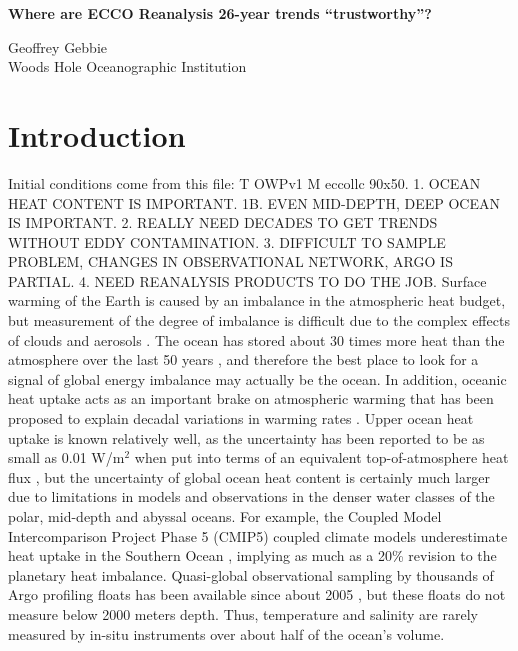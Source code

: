 \documentclass[authoryear,round,12pt]{article}
\begin{document}

 

\newpage
\setcounter{page}{0}

\begin{center}

 \bigskip
 
  \textbf{{\Large Where are ECCO Reanalysis 26-year trends  ``trustworthy''?}}

 \bigskip
 Geoffrey Gebbie \\
Woods Hole Oceanographic Institution
\end{center}


\medskip
\newpage

\setcounter{page}{1}

\section{Introduction} 
\label{sec:introduction}

Initial conditions come from this file: T OWPv1 M eccollc 90x50. 
1. OCEAN HEAT CONTENT IS IMPORTANT.
1B. EVEN MID-DEPTH, DEEP OCEAN IS IMPORTANT.
2. REALLY NEED DECADES TO GET TRENDS WITHOUT EDDY CONTAMINATION.
3. DIFFICULT TO SAMPLE PROBLEM, CHANGES IN OBSERVATIONAL NETWORK, ARGO
IS PARTIAL.
4. NEED REANALYSIS PRODUCTS TO DO THE JOB.
Surface warming of the Earth is caused by an imbalance in the
atmospheric heat budget, but measurement of the degree of imbalance is
difficult due to the complex effects of clouds and aerosols
\citep[e.g.,][]{myhre2013anthropogenic}. The ocean has
stored about 30 times more heat than the atmosphere over the last 50
years
\citep[e.g.,][]{Levitus-Antonov-2005:Warming,Lyman-Johnson-2014:Estimating},
and therefore the best place to look for a signal of global energy
imbalance may actually be the ocean. In addition, oceanic heat uptake
acts as an important brake on atmospheric warming that has been
proposed to explain decadal variations in warming rates
\citep[e.g.,][]{Meehl-Arblaster-2011:Model,Trenberth-Fasullo-2013:apparent}. Upper
ocean heat uptake is known relatively well, as the uncertainty has
been reported to be as small as 0.01 W/m$^2$ when put into terms of an
equivalent top-of-atmosphere heat flux
\citep{Balmaseda-Trenberth-2013:Distinctive}, but the uncertainty of
global ocean heat content is certainly much larger due to limitations
in models and observations in the denser water classes of the polar,
mid-depth and abyssal oceans. For example, the Coupled Model
Intercomparison Project Phase 5 (CMIP5) coupled climate models
underestimate heat uptake in the Southern Ocean
\citep{Durack-Gleckler-2014:Quantifying}, implying as much as a 20\%
revision to the planetary heat imbalance. Quasi-global observational
sampling by thousands of Argo profiling floats has been available
since about 2005 \citep[e.g.,][]{Wijffels-Roemmich-2016:Ocean}, but
these floats do not measure below 2000 meters depth. Thus, temperature
and salinity are rarely measured by in-situ instruments over about
half of the ocean's volume.
\end{document}
